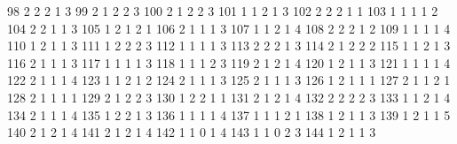 \documentclass[
  letterpaper,
  DIV=11,
  numbers=noendperiod]{scrreprt}
\newenvironment{Shaded}{\begin{snugshade}}{\end{snugshade}}
\newcommand{\NormalTok}[1]{\textcolor[rgb]{0.00,0.23,0.31}{#1}}
\begin{document}
\begin{Shaded}
\begin{Highlighting}[]
\NormalTok{98          2         2     2    1        3}
\NormalTok{99          2         1     2    2        3}
\NormalTok{100         2         1     2    2        3}
\NormalTok{101         1         1     2    1        3}
\NormalTok{102         2         2     2    1        1}
\NormalTok{103         1         1     1    1        2}
\NormalTok{104         2         2     1    1        3}
\NormalTok{105         1         2     1    2        1}
\NormalTok{106         2         1     1    1        3}
\NormalTok{107         1         1     2    1        4}
\NormalTok{108         2         2     2    1        2}
\NormalTok{109         1         1     1    1        4}
\NormalTok{110         1         2     1    1        3}
\NormalTok{111         1         2     2    2        3}
\NormalTok{112         1         1     1    1        3}
\NormalTok{113         2         2     2    1        3}
\NormalTok{114         2         1     2    2        2}
\NormalTok{115         1         1     2    1        3}
\NormalTok{116         2         1     1    1        3}
\NormalTok{117         1         1     1    1        3}
\NormalTok{118         1         1     1    2        3}
\NormalTok{119         2         1     2    1        4}
\NormalTok{120         1         2     1    1        3}
\NormalTok{121         1         1     1    1        4}
\NormalTok{122         2         1     1    1        4}
\NormalTok{123         1         1     2    1        2}
\NormalTok{124         2         1     1    1        3}
\NormalTok{125         2         1     1    1        3}
\NormalTok{126         1         2     1    1        1}
\NormalTok{127         2         1     1    2        1}
\NormalTok{128         2         1     1    1        1}
\NormalTok{129         2         1     2    2        3}
\NormalTok{130         1         2     2    1        1}
\NormalTok{131         2         1     2    1        4}
\NormalTok{132         2         2     2    2        3}
\NormalTok{133         1         1     2    1        4}
\NormalTok{134         2         1     1    1        4}
\NormalTok{135         1         2     2    1        3}
\NormalTok{136         1         1     1    1        4}
\NormalTok{137         1         1     1    2        1}
\NormalTok{138         1         2     1    1        3}
\NormalTok{139         1         2     1    1        5}
\NormalTok{140         2         1     2    1        4}
\NormalTok{141         2         1     2    1        4}
\NormalTok{142         1         1     0    1        4}
\NormalTok{143         1         1     0    2        3}
\NormalTok{144         1         2     1    1        3}

\end{Highlighting}
\end{Shaded}
\end{document}
